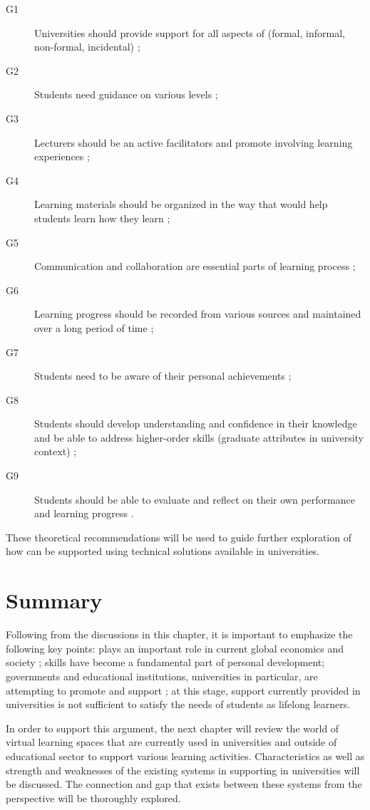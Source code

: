 \begin{description}
  \item[G1] Universities should provide support for all aspects of \LLLs
  (formal, informal, non-formal, incidental) \citep{Smidt2011};
  \item[G2] Students need guidance on various levels \citep{Leone2019};
  \item[G3] Lecturers should be an active facilitators and promote involving
  learning experiences \citep{Leone2019}; 
  \item[G4] Learning materials should be organized in the way that would help
students learn how they learn \citep{Medel-Anonuevo2001};
  \item[G5] Communication and collaboration are essential parts of learning
  process \citep{Schaffert2008};
  \item[G6] Learning progress should be recorded from various sources and
  maintained over a long period of time \citep{Kay2008};
  \item[G7] Students need to be aware of their personal achievements
\citep{Schuetze2006};
  \item[G8] Students should develop understanding and confidence in their
  knowledge and be able to address higher-order skills (graduate attributes in university
  context) \citep{Hart1999};
  \item[G9] Students should be able to evaluate and reflect on their own
  performance and learning progress \citep{Mourtos2003}.
\end{description} 

These theoretical recommendations will be used to guide further exploration of
 how \LLLs can be supported using technical solutions available in universities.

\section{Summary} 

Following from the discussions in this chapter, it is important to emphasize
the following key points: \LLLs plays an important role in current global
economics and society
\citep{Jarvis2008,Simmons-McDonald2009,InternationalLabourOffice2008}; \LLLs
skills have become a fundamental part of personal development; governments and
educational institutions, universities in particular, are attempting to promote
and support \LLLsn; at this stage, \LLLs support currently provided in
universities is not sufficient to satisfy the needs of students as lifelong
learners.

In order to support this argument, the next chapter will review the world of
virtual learning spaces that are currently used in universities and outside of
educational sector to support various learning activities. Characteristics as
well as strength and weaknesses of the existing systems in supporting \LLLs
in universities will be discussed. The connection and gap that exists between
these systems from the \LLLs perspective will be thoroughly explored.
